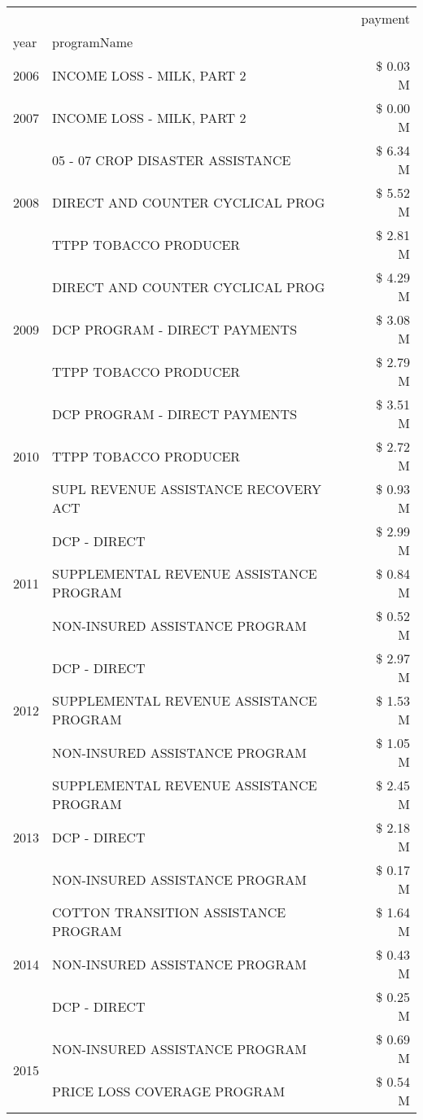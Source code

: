 \begin{tabular}{llr}
\toprule
 &  & payment \\
year & programName &  \\
\midrule
2006 & INCOME LOSS - MILK, PART 2 & \$ 0.03 M \\
\cline{1-3}
2007 & INCOME LOSS - MILK, PART 2 & \$ 0.00 M \\
\cline{1-3}
\multirow[t]{3}{*}{2008} & 05 - 07 CROP DISASTER ASSISTANCE & \$ 6.34 M \\
 & DIRECT AND COUNTER CYCLICAL PROG & \$ 5.52 M \\
 & TTPP TOBACCO PRODUCER & \$ 2.81 M \\
\cline{1-3}
\multirow[t]{3}{*}{2009} & DIRECT AND COUNTER CYCLICAL PROG & \$ 4.29 M \\
 & DCP PROGRAM - DIRECT PAYMENTS & \$ 3.08 M \\
 & TTPP TOBACCO PRODUCER & \$ 2.79 M \\
\cline{1-3}
\multirow[t]{3}{*}{2010} & DCP PROGRAM - DIRECT PAYMENTS & \$ 3.51 M \\
 & TTPP TOBACCO PRODUCER & \$ 2.72 M \\
 & SUPL REVENUE ASSISTANCE RECOVERY ACT & \$ 0.93 M \\
\cline{1-3}
\multirow[t]{3}{*}{2011} & DCP - DIRECT & \$ 2.99 M \\
 & SUPPLEMENTAL REVENUE ASSISTANCE PROGRAM & \$ 0.84 M \\
 & NON-INSURED ASSISTANCE PROGRAM & \$ 0.52 M \\
\cline{1-3}
\multirow[t]{3}{*}{2012} & DCP - DIRECT & \$ 2.97 M \\
 & SUPPLEMENTAL REVENUE ASSISTANCE PROGRAM & \$ 1.53 M \\
 & NON-INSURED ASSISTANCE PROGRAM & \$ 1.05 M \\
\cline{1-3}
\multirow[t]{3}{*}{2013} & SUPPLEMENTAL REVENUE ASSISTANCE PROGRAM & \$ 2.45 M \\
 & DCP - DIRECT & \$ 2.18 M \\
 & NON-INSURED ASSISTANCE PROGRAM & \$ 0.17 M \\
\cline{1-3}
\multirow[t]{3}{*}{2014} & COTTON TRANSITION ASSISTANCE PROGRAM & \$ 1.64 M \\
 & NON-INSURED ASSISTANCE PROGRAM & \$ 0.43 M \\
 & DCP - DIRECT & \$ 0.25 M \\
\cline{1-3}
\multirow[t]{3}{*}{2015} & NON-INSURED ASSISTANCE PROGRAM & \$ 0.69 M \\
 & PRICE LOSS COVERAGE PROGRAM & \$ 0.54 M \\

\end{tabular}
